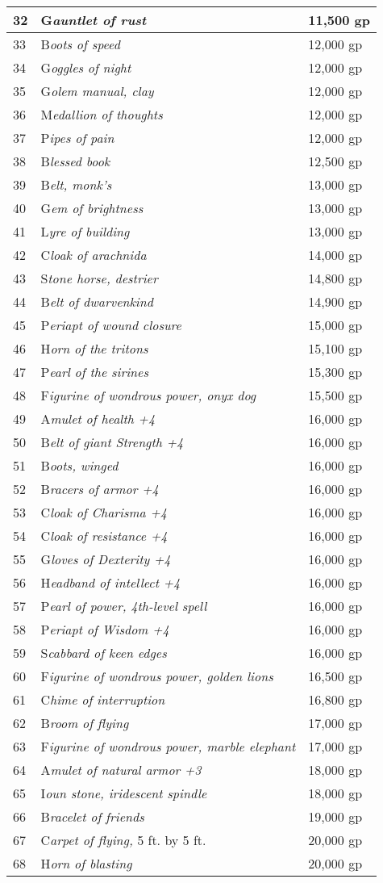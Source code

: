 \documentclass{article}
\begin{document}
\begin{tabular}{|>{\raggedright}p{14pt}|>{\raggedright}p{183pt}|>{\raggedright}p{55pt}|}
\hline
32 & G\textit{auntlet of rust} & 11,500 gp\tabularnewline
\hline
33 & B\textit{oots of speed} & 12,000 gp\tabularnewline
\hline
34 & G\textit{oggles of night} & 12,000 gp\tabularnewline
\hline
35 & G\textit{olem manual, clay} & 12,000 gp\tabularnewline
\hline
36 & M\textit{edallion of thoughts} & 12,000 gp\tabularnewline
\hline
37 & P\textit{ipes of pain} & 12,000 gp\tabularnewline
\hline
38 & B\textit{lessed book} & 12,500 gp\tabularnewline
\hline
39 & B\textit{elt, monk's} & 13,000 gp\tabularnewline
\hline
40 & G\textit{em of brightness} & 13,000 gp\tabularnewline
\hline
41 & L\textit{yre of building} & 13,000 gp\tabularnewline
\hline
42 & C\textit{loak of arachnida} & 14,000 gp\tabularnewline
\hline
43 & S\textit{tone horse, destrier} & 14,800 gp\tabularnewline
\hline
44 & B\textit{elt of dwarvenkind} & 14,900 gp\tabularnewline
\hline
45 & P\textit{eriapt of wound closure} & 15,000 gp\tabularnewline
\hline
46 & H\textit{orn of the tritons} & 15,100 gp\tabularnewline
\hline
47 & P\textit{earl of the sirines} & 15,300 gp\tabularnewline
\hline
48 & F\textit{igurine of wondrous power, onyx dog} & 15,500 gp\tabularnewline
\hline
49 & A\textit{mulet of health +4} & 16,000 gp\tabularnewline
\hline
50 & B\textit{elt of giant Strength +4} & 16,000 gp\tabularnewline
\hline
51 & B\textit{oots, winged} & 16,000 gp\tabularnewline
\hline
52 & B\textit{racers of armor +4} & 16,000 gp\tabularnewline
\hline
53 & C\textit{loak of Charisma +4} & 16,000 gp\tabularnewline
\hline
54 & C\textit{loak of resistance +4} & 16,000 gp\tabularnewline
\hline
55 & G\textit{loves of Dexterity +4} & 16,000 gp\tabularnewline
\hline
56 & H\textit{eadband of intellect +4} & 16,000 gp\tabularnewline
\hline
57 & P\textit{earl of power, 4th-level spell} & 16,000 gp\tabularnewline
\hline
58 & P\textit{eriapt of Wisdom +4} & 16,000 gp\tabularnewline
\hline
59 & S\textit{cabbard of keen edges} & 16,000 gp\tabularnewline
\hline
60 & F\textit{igurine of wondrous power, golden lions} & 16,500 gp\tabularnewline
\hline
61 & C\textit{hime of interruption} & 16,800 gp\tabularnewline
\hline
62 & B\textit{room of flying} & 17,000 gp\tabularnewline
\hline
63 & F\textit{igurine of wondrous power, marble elephant} & 17,000 gp\tabularnewline
\hline
64 & A\textit{mulet of natural armor +3} & 18,000 gp\tabularnewline
\hline
65 & I\textit{oun stone, iridescent spindle} & 18,000 gp\tabularnewline
\hline
66 & B\textit{racelet of friends} & 19,000 gp\tabularnewline
\hline
67 & C\textit{arpet of flying, }5 ft. by 5 ft. & 20,000 gp\tabularnewline
\hline
68 & H\textit{orn of blasting} & 20,000 gp\tabularnewline

\end{tabular}
\end{document}
